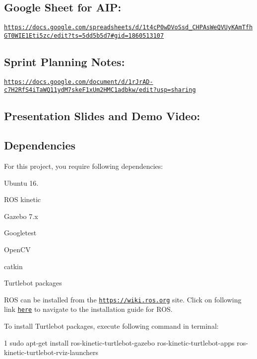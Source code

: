 \subsection*{Google Sheet for A\+IP\+:}

\href{https://docs.google.com/spreadsheets/d/1t4cP0wDVoSsd_CHPAsWeQVUyKAmTfhGT0WIE1Eti5zc/edit?ts=5dd5b5d7#gid=1860513107}{\tt https\+://docs.\+google.\+com/spreadsheets/d/1t4c\+P0w\+D\+Vo\+Ssd\+\_\+\+C\+H\+P\+As\+We\+Q\+V\+Uy\+K\+Am\+Tfh\+G\+T0\+W\+I\+E1\+Eti5zc/edit?ts=5dd5b5d7\#gid=1860513107}

\subsection*{Sprint Planning Notes\+:}

\href{https://docs.google.com/document/d/1rJrAD-c7H2RfS4iTaWQ11ydM7skeF1xUm2HMC1adbkw/edit?usp=sharing}{\tt https\+://docs.\+google.\+com/document/d/1r\+Jr\+A\+D-\/c7\+H2\+Rf\+S4i\+Ta\+W\+Q11yd\+M7ske\+F1x\+Um2\+H\+M\+C1adbkw/edit?usp=sharing}

\subsection*{Presentation Slides and Demo Video\+:}

\subsection*{Dependencies}

For this project, you require following dependencies\+:


\begin{DoxyItemize}
\item Ubuntu 16.
\item R\+OS kinetic
\item Gazebo 7.\+x
\item Googletest
\item Open\+CV
\item catkin
\item Turtlebot packages
\end{DoxyItemize}

R\+OS can be installed from the \href{https://wiki.ros.org}{\tt https\+://wiki.\+ros.\+org} site. Click on following link \href{https://wiki.ros.org/kinetic/Installation}{\tt here} to navigate to the installation guide for R\+OS.

To install Turtlebot packages, execute following command in terminal\+: 
\begin{DoxyCode}
1 sudo apt-get install ros-kinetic-turtlebot-gazebo ros-kinetic-turtlebot-apps
       ros-kinetic-turtlebot-rviz-launchers
\end{DoxyCode}



